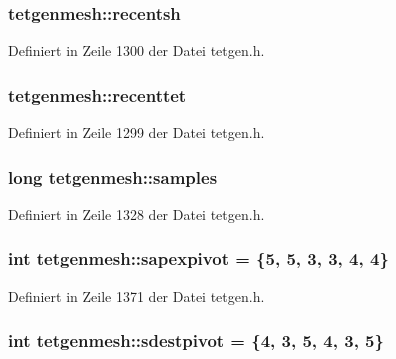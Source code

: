 \hypertarget{classtetgenmesh_a4a048baa9087fca5c9ce9df91ad3a60f}{
\subsubsection[{recentsh}]{ tetgenmesh\-::recentsh}}\label{classtetgenmesh_a4a048baa9087fca5c9ce9df91ad3a60f}


Definiert in Zeile 1300 der Datei tetgen.\-h.

\hypertarget{classtetgenmesh_ae18c5fda5cd5ef44db455a71b875b48a}{
\subsubsection[{recenttet}]{ tetgenmesh\-::recenttet}}\label{classtetgenmesh_ae18c5fda5cd5ef44db455a71b875b48a}


Definiert in Zeile 1299 der Datei tetgen.\-h.

\hypertarget{classtetgenmesh_a0f1e1bd695df6ce04f21329a585e1b84}{
\subsubsection[{samples}]{\setlength{\rightskip}{0pt plus 5cm}long tetgenmesh\-::samples}}\label{classtetgenmesh_a0f1e1bd695df6ce04f21329a585e1b84}


Definiert in Zeile 1328 der Datei tetgen.\-h.

\hypertarget{classtetgenmesh_a25610aea34045250cbd88b54d4734383}{
\subsubsection[{sapexpivot}]{\setlength{\rightskip}{0pt plus 5cm}int tetgenmesh\-::sapexpivot = \{5, 5, 3, 3, 4, 4\}\hspace{0.3cm}{\ttfamily [static]}}}\label{classtetgenmesh_a25610aea34045250cbd88b54d4734383}


Definiert in Zeile 1371 der Datei tetgen.\-h.

\hypertarget{classtetgenmesh_a1d8ce836af65d2a6c2c008b43112ca5b}{
\subsubsection[{sdestpivot}]{\setlength{\rightskip}{0pt plus 5cm}int tetgenmesh\-::sdestpivot = \{4, 3, 5, 4, 3, 5\}\hspace{0.3cm}{\ttfamily [static]}}}\label{classtetgenmesh_a1d8ce836af65d2a6c2c008b43112ca5b}


